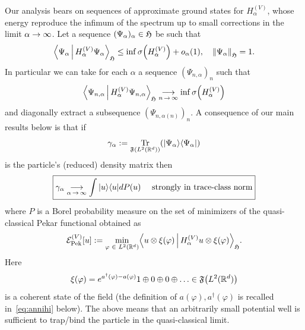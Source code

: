 \documentclass[AHL,Unicode,longabstracts,published]{cedram}
\DeclareMathOperator{\Tr}{Tr}
\newcommand{\R}{\mathbb{R}}
\newcommand{\gH}{\mathfrak{H}}
\newcommand{\gF}{\mathfrak{F}}
\newcommand{\cE}{\mathcal{E}}
\newcommand{\1}{\mathds{1}}
\newcommand{\cEP}{\cE_{\mathrm{Pek}}}
\let\oldin\in
\renewcommand{\in}{\mathchoice{\oldin}{\oldin}{\,\oldin\,}{\,\oldin\,}}
\renewcommand*{\to}{\mathchoice{\longrightarrow}{\rightarrow}{\rightarrow}{\rightarrow}}
\let\originalleft\left
\let\originalright\right
\renewcommand{\left}{\mathopen{}\mathclose\bgroup\originalleft}
\renewcommand{\right}{\aftergroup\egroup\originalright}
\begin{document}
Our analysis bears on sequences of approximate ground states for $H_\alpha^{(V)}$, whose energy reproduce the infimum of the spectrum up to small corrections in the limit $\alpha \to \infty$. Let a sequence $(\Psi_\alpha)_\alpha \in \gH$ be such that
\begin{equation}\label{eq:approx GS}
\left\langle \Psi_\alpha\, \middle|\, H_\alpha^{(V)} \Psi_\alpha\right\rangle_{\gH} \leq \inf \sigma \left(H_\alpha^{(V)}\right) +o_{\alpha} (1), \quad \left\|\Psi_\alpha \right\|_\gH = 1.
\end{equation}
In particular we can take for each $\alpha$ a sequence $(\Psi_{n,\alpha})_n$ such that
\begin{equation*}
\left\langle \Psi_{n,\alpha} \, \middle|\, H_\alpha^{(V)} \Psi_{n,\alpha} \right\rangle_{\gH} \underset{n\,\to\,\infty}{\to} \inf \sigma\left(H_\alpha^{(V)}\right)
\end{equation*}
and diagonally extract a subsequence $(\Psi_{n,\alpha(n)})_n$. A consequence of our main results below is that if
\begin{equation}\label{eq:intro DM}
\gamma_\alpha := \Tr_{\gF(L^2 (\R^d))} \left(|\Psi_\alpha \rangle \langle \Psi_\alpha|\right)
\end{equation}
is the particle's (reduced) density matrix then
\begin{equation}\label{eq:intro main 1}
\boxed{\gamma_\alpha \underset{\alpha\,\to\,\infty}{\to} \int |u\rangle \langle u| dP (u) \quad\text{ strongly in trace-class norm}}
\end{equation}
where $P$ is a Borel probability measure on the set of minimizers of the quasi-classical Pekar functional obtained as
\begin{equation*}
\cEP^{(V)} [u] := \min_{\varphi \in L^2 (\R^d)} \left\langle u \otimes \xi (\varphi) \,\middle|\, H_\alpha^{(V)} u \otimes \xi (\varphi)\right\rangle_\gH.
\end{equation*}
Here
\begin{equation*}
\xi (\varphi) = e^{a^\dagger (\varphi) -a (\varphi) } 1 \oplus 0 \oplus 0 \oplus \ldots \in \gF \left(L^2 (\R^d)\right)
\end{equation*}
is a coherent state of the field (the definition of $a(\varphi),a^\dagger (\varphi)$ is recalled in~\eqref{eq:annihi} below). The above means that an arbitrarily small potential well is sufficient to trap/bind the particle in the quasi-classical limit.


\end{document}
